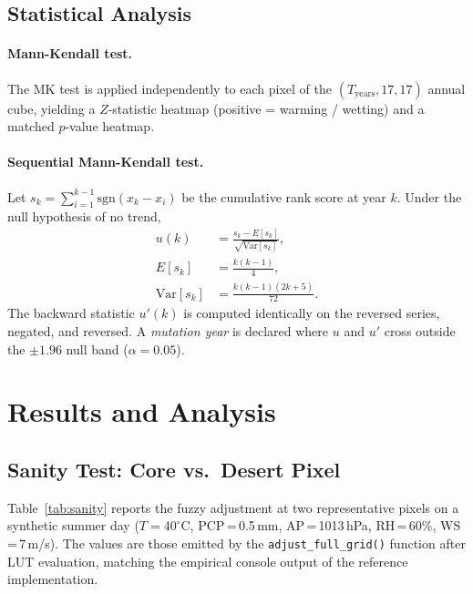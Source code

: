 \documentclass[conference]{IEEEtran}
\begin{document}
\subsection{Statistical Analysis}

\paragraph{Mann-Kendall test.}  The MK test
\cite{mann1945nonparametric,kendall1975rank} is applied independently to
each pixel of the \((T_{\mathrm{years}},17,17)\) annual cube, yielding a
\(Z\)-statistic heatmap (positive = warming / wetting) and a matched
\(p\)-value heatmap.

\paragraph{Sequential Mann-Kendall test.}  Let
\(s_k=\sum_{i=1}^{k-1}\mathrm{sgn}(x_k-x_i)\) be the cumulative rank
score at year \(k\).  Under the null hypothesis of no trend,
\begin{align}
  u(k) &= \frac{s_k - E[s_k]}{\sqrt{\mathrm{Var}[s_k]}}, \label{eq:uk}\\
  E[s_k] &= \tfrac{k(k-1)}{4}, \\
  \mathrm{Var}[s_k] &= \tfrac{k(k-1)(2k+5)}{72}.
\end{align}
The backward statistic \(u'(k)\) is computed identically on the reversed
series, negated, and reversed.  A \emph{mutation year}
\cite{sneyers1990climate} is declared where \(u\) and \(u'\) cross
outside the \(\pm 1.96\) null band (\(\alpha=0.05\)).

\section{Results and Analysis}
\label{sec:results}

\subsection{Sanity Test: Core vs.\ Desert Pixel}
\label{sec:sanity}

Table~\ref{tab:sanity} reports the fuzzy adjustment at two representative
pixels on a synthetic summer day
(\(T\!=\!40^{\circ}\)C, PCP\,=\,0.5\,mm, AP\,=\,1013\,hPa,
RH\,=\,60\%, WS\,=\,7\,m/s).  The values are those emitted by the
\texttt{adjust\_full\_grid()} function after LUT evaluation, matching
the empirical console output of the reference implementation.
\end{document}
